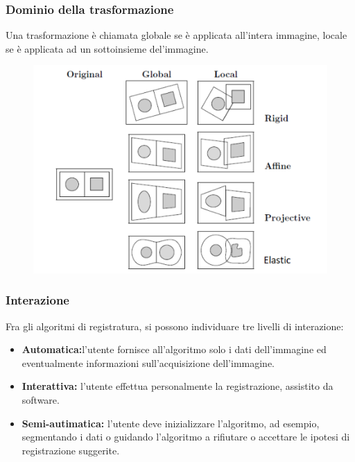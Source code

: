 \newpage
\subsubsection{Dominio della trasformazione}
Una trasformazione è chiamata globale se è applicata all'intera immagine, locale se è applicata ad un sottoinsieme del'immagine.

\begin{figure}[H]
    \centering
    \includegraphics[width=\linewidth, keepaspectratio]{capitoli/immagini/imgs/dominio.png}
\end{figure}

\subsubsection{Interazione}

Fra gli algoritmi di registratura, si possono individuare tre livelli di interazione:

\begin{itemize}
    \item \textbf{Automatica:}l'utente fornisce all'algoritmo solo i dati
          dell'immagine ed eventualmente informazioni sull'acquisizione
          dell'immagine.
    \item \textbf{Interattiva:} l'utente effettua personalmente la registrazione,
          assistito da software.
    \item \textbf{Semi-autimatica:} l'utente deve inizializzare l'algoritmo, ad esempio, segmentando i dati o guidando l'algoritmo a rifiutare
          o accettare le ipotesi di registrazione suggerite.
\end{itemize}

